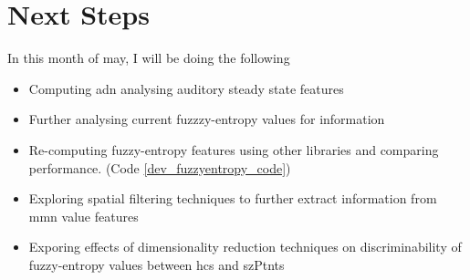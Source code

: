\documentclass[10pt]{article}
\begin{document}
\section{Next Steps}
In this month of may, I will be doing the following
\begin{itemize}
  \item Computing adn analysing auditory steady state features
  \item Further analysing current fuzzzy-entropy values for information
  \item Re-computing fuzzy-entropy features using other libraries and comparing performance.
  (Code \ref{dev_fuzzyentropy_code})
  \item Exploring spatial filtering techniques to further extract information from 
  \gls{mmn} value features
  \item Exporing effects of dimensionality reduction techniques on discriminability of 
  fuzzy-entropy values between \glspl{hc} and \glspl{szPtnt}
\end{itemize}

\clearpage
\end{document}
